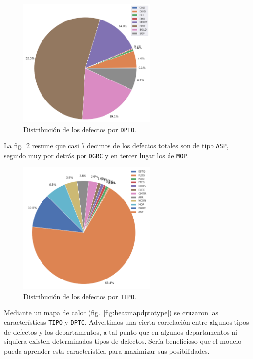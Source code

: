 \documentclass[a4paper,12pt]{article}
\begin{document}
		\begin{figure}[H]
			\begin{center}				
				\includegraphics[width=0.61\textwidth]{tesis_53.png}
				\caption{Distribución de los defectos por \texttt{DPTO}.}
				\label{fig:distgvddpto}
			\end{center}
		\end{figure}
		
		La fig.~\ref{fig:distgvdtype} resume que casi 7 decimos de los defectos totales son de tipo \texttt{ASP}, seguido muy por detrás por \texttt{DGRC} y en tercer lugar los de \texttt{MOP}.
		
		\begin{figure}[H]
			\begin{center}				
				\includegraphics[width=0.61\textwidth]{tesis_55.png}
				\caption{Distribución de los defectos por \texttt{TIPO}.}
				\label{fig:distgvdtype}
			\end{center}
		\end{figure}
		
		Mediante un mapa de calor (fig.~\ref{fig:heatmapdptotype}) se cruzaron las características \texttt{TIPO} y \texttt{DPTO}. Advertimos una cierta correlación entre algunos tipos de defectos y los departamentos, a tal punto que en algunos departamentos ni siquiera existen determinados tipos de defectos. Sería beneficioso que el modelo pueda aprender esta característica para maximizar sus posibilidades.
		
\end{document}
